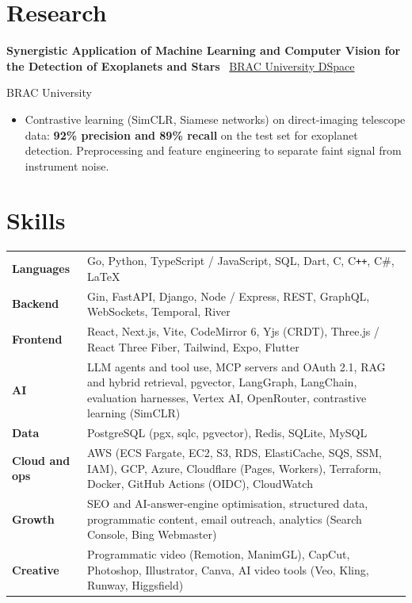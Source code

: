 \documentclass[10pt,a4paper]{article}
\def\dspaceurl{}
\newcommand{\lnk}[2]{\href{#1}{\color{accent}#2}}
\newcommand{\sep}{\unskip\enspace{\color{muted}\textbar}\enspace\ignorespaces}
\begin{document}
\section{Research}
\textbf{Synergistic Application of Machine Learning and Computer Vision for the Detection of Exoplanets and Stars}
\ifx\dspaceurl\empty\else\ \sep \lnk{\dspaceurl}{BRAC University DSpace}\fi\par
{\small\color{muted}BRAC University}
\begin{itemize}
  \item Contrastive learning (SimCLR, Siamese networks) on direct-imaging telescope data: \textbf{92\% precision and 89\% recall}
        on the test set for exoplanet detection. Preprocessing and feature engineering to separate faint signal from
        instrument noise.
\end{itemize}

\section{Skills}
\begin{tabularx}{\linewidth}{@{}l@{\hspace{8pt}}X@{}}
  \textbf{Languages}     & Go, Python, TypeScript / JavaScript, SQL, Dart, C, C\texttt{++}, C\#, LaTeX \\
  \textbf{Backend}       & Gin, FastAPI, Django, Node / Express, REST, GraphQL, WebSockets, Temporal, River \\
  \textbf{Frontend}      & React, Next.js, Vite, CodeMirror 6, Yjs (CRDT), Three.js / React Three Fiber, Tailwind, Expo, Flutter \\
  \textbf{AI}            & LLM agents and tool use, MCP servers and OAuth 2.1, RAG and hybrid retrieval, pgvector, LangGraph, LangChain,
                           evaluation harnesses, Vertex AI, OpenRouter, contrastive learning (SimCLR) \\
  \textbf{Data}          & PostgreSQL (pgx, sqlc, pgvector), Redis, SQLite, MySQL \\
  \textbf{Cloud and ops} & AWS (ECS Fargate, EC2, S3, RDS, ElastiCache, SQS, SSM, IAM), GCP, Azure, Cloudflare (Pages, Workers),
                           Terraform, Docker, GitHub Actions (OIDC), CloudWatch \\
  \textbf{Growth}        & SEO and AI-answer-engine optimisation, structured data, programmatic content, email outreach,
                           analytics (Search Console, Bing Webmaster) \\
  \textbf{Creative}      & Programmatic video (Remotion, ManimGL), CapCut, Photoshop, Illustrator, Canva,
                           AI video tools (Veo, Kling, Runway, Higgsfield) \\
\end{tabularx}
\end{document}

